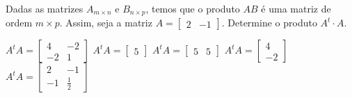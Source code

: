 Dadas as matrizes $A_{m\times n}$ e $B_{n\times p}$, temos que o produto $AB$ é uma matriz de ordem $m\times p$. Assim, seja a matriz $A = \left[ \begin{array}{cc}
2 & -1
\end{array} \right]$. Determine o produto $A^t\cdot A$.

$A^tA=\left[ \begin{array}{cc} 4 & -2 \\ -2 & 1 \end{array} \right]$
$A^tA=\left[ \begin{array}{c} 5 \end{array} \right]$
$A^tA=\left[ \begin{array}{cc} 5 & 5 \end{array} \right]$
$A^tA=\left[ \begin{array}{c} 4 \\ -2 \end{array} \right]$
$A^tA=\left[ \begin{array}{cc} 2 & -1 \\ -1 & \frac{1}{2} \end{array} \right]$



